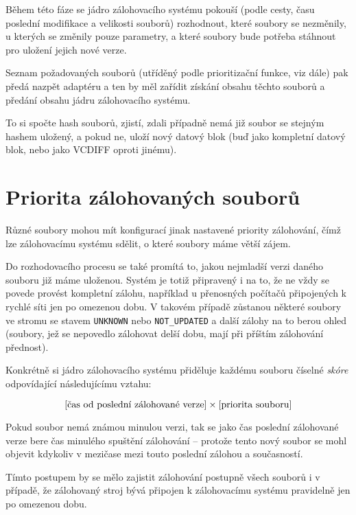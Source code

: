 Během této fáze se jádro zálohovacího systému pokouší (podle cesty, času poslední
modifikace a velikosti souborů) rozhodnout, které soubory se nezměnily, u kterých
se změnily pouze parametry, a které soubory bude potřeba stáhnout pro uložení
jejich nové verze.

Seznam požadovaných souborů (utříděný podle prioritizační funkce, viz dále) pak
předá nazpět adaptéru a ten by měl zařídit získání obsahu těchto souborů a
předání obsahu jádru zálohovacího systému.

To si spočte hash souborů, zjistí, zdali případně nemá již soubor se stejným
hashem uložený, a pokud ne, uloží nový datový blok (buď jako kompletní datový
blok, nebo jako \gls{VCDIFF} oproti jinému).

\section{Priorita zálohovaných souborů}

Různé soubory mohou mít konfigurací jinak nastavené priority zálohování, čímž
lze zálohovacímu systému sdělit, o které soubory máme větší zájem.

Do rozhodovacího procesu se také promítá to, jakou nejmladší verzi daného
souboru již máme uloženou. Systém je totiž připravený i na to, že ne vždy se
povede provést kompletní zálohu, například u přenosných počítačů připojených k
rychlé síti jen po omezenou dobu. V takovém případě zůstanou některé soubory ve
stromu se stavem \texttt{UNKNOWN} nebo \texttt{NOT\_UPDATED} a další zálohy na
to berou ohled (soubory, jež se nepovedlo zálohovat delší dobu, mají při příštím
zálohování přednost).

Konkrétně si jádro zálohovacího systému přiděluje každému souboru číselné
{\it skóre} odpovídající následujícímu vztahu:

$$[\hbox{čas od poslední zálohované verze}]\times[\hbox{priorita souboru}]$$

Pokud soubor nemá známou minulou verzi, tak se jako čas poslední zálohované
verze bere čas minulého spuštění zálohování -- protože tento nový soubor se mohl
objevit kdykoliv v mezičase mezi touto poslední zálohou a současností.

Tímto postupem by se mělo zajistit zálohování postupně všech souborů i v případě,
že zálohovaný stroj bývá připojen k zálohovacímu systému pravidelně jen po
omezenou dobu.
